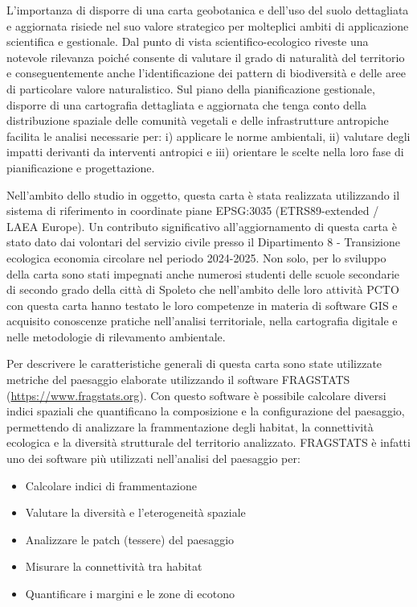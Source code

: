\documentclass[
  a4paper,
]{book}
\providecommand{\tightlist}{%
  \setlength{\itemsep}{0pt}\setlength{\parskip}{0pt}}
\begin{document}
L'importanza di disporre di una carta geobotanica e dell'uso del suolo dettagliata e aggiornata risiede nel suo valore strategico per molteplici ambiti di applicazione scientifica e gestionale.
Dal punto di vista scientifico-ecologico riveste una notevole rilevanza poiché consente di valutare il grado di naturalità del territorio e conseguentemente anche l'identificazione dei pattern di biodiversità e delle aree di particolare valore naturalistico.
Sul piano della pianificazione gestionale, disporre di una cartografia dettagliata e aggiornata che tenga conto della distribuzione spaziale delle comunità vegetali e delle infrastrutture antropiche facilita le analisi necessarie per: i) applicare le norme ambientali, ii) valutare degli impatti derivanti da interventi antropici e iii) orientare le scelte nella loro fase di pianificazione e progettazione.

Nell'ambito dello studio in oggetto, questa carta è stata realizzata utilizzando il sistema di riferimento in coordinate piane EPSG:3035 (ETRS89-extended / LAEA Europe).
Un contributo significativo all'aggiornamento di questa carta è stato dato dai volontari del servizio civile presso il Dipartimento 8 - Transizione ecologica economia circolare nel periodo 2024-2025.
Non solo, per lo sviluppo della carta sono stati impegnati anche numerosi studenti delle scuole secondarie di secondo grado della città di Spoleto che nell'ambito delle loro attività PCTO con questa carta hanno testato le loro competenze in materia di software GIS e acquisito conoscenze pratiche nell'analisi territoriale, nella cartografia digitale e nelle metodologie di rilevamento ambientale.

Per descrivere le caratteristiche generali di questa carta sono state utilizzate metriche del paesaggio elaborate utilizzando il software FRAGSTATS (\url{https://www.fragstats.org})\citep{mcgarigalFragstatHelp2015}.
Con questo software è possibile calcolare diversi indici spaziali che quantificano la composizione e la configurazione del paesaggio, permettendo di analizzare la frammentazione degli habitat, la connettività ecologica e la diversità strutturale del territorio analizzato.
FRAGSTATS è infatti uno dei software più utilizzati nell'analisi del paesaggio per:

\begin{itemize}
\tightlist
\item
  Calcolare indici di frammentazione
\item
  Valutare la diversità e l'eterogeneità spaziale
\item
  Analizzare le patch (tessere) del paesaggio
\item
  Misurare la connettività tra habitat
\item
  Quantificare i margini e le zone di ecotono
\end{itemize}
\end{document}
